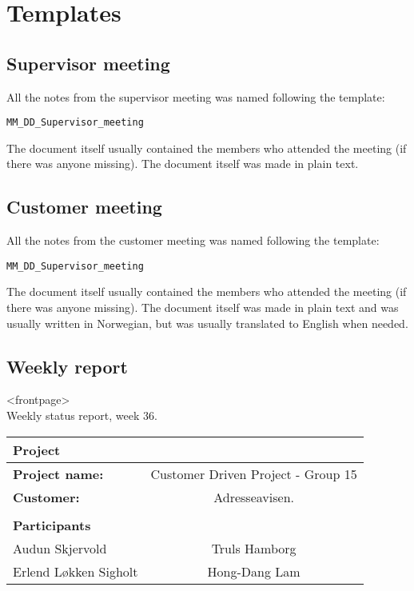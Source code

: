 \section{Templates}\label{appendixTemplate}
\subsection{Supervisor meeting}
All the notes from the supervisor meeting was named following the template: 
\begin{verbatim}
MM_DD_Supervisor_meeting
\end{verbatim}
The document itself usually contained the members who attended the meeting (if there was anyone missing).
The document itself was made in plain text.
\newpage
\subsection{Customer meeting}
All the notes from the customer meeting was named following the template: 
\begin{verbatim}
MM_DD_Supervisor_meeting
\end{verbatim}
The document itself usually contained the members who attended the meeting (if there was anyone missing).
The document itself was made in plain text and was usually written in Norwegian, but was usually translated to English when needed.

\subsection{Weekly report}

\begin{center}
<frontpage>\\
Weekly status report, week 36.
  \begin{tabular}{| l  c |}
    \hline
    Project & \\ \hline
    \textbf{Project name:} & Customer Driven Project - Group 15 \\
    \textbf{Customer:} & Adresseavisen. \\ \hline
     & \\
     \textbf{Participants} & \\ \hline
     Audun Skjervold & Truls Hamborg \\
     Erlend Løkken Sigholt & Hong-Dang Lam \\
    \hline
  \end{tabular}
  \end{center}




